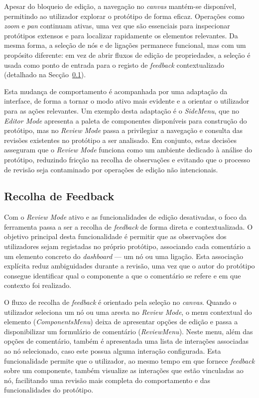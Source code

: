 Apesar do bloqueio de edição, a navegação no \textit{canvas} mantém-se disponível, permitindo ao utilizador explorar o protótipo de forma eficaz. Operações como \textit{zoom} e \textit{pan} continuam ativas, uma vez que são essenciais para inspecionar protótipos extensos e para localizar rapidamente os elementos relevantes. Da mesma forma, a seleção de nós e de ligações permanece funcional, mas com um propósito diferente: em vez de abrir fluxos de edição de propriedades, a seleção é usada como ponto de entrada para o registo de \textit{feedback} contextualizado (detalhado na Secção~\ref{subsec:cap4_review_integracao}).

Esta mudança de comportamento é acompanhada por uma adaptação da interface, de forma a tornar o modo ativo mais evidente e a orientar o utilizador para as ações relevantes. Um exemplo desta adaptação é o \textit{SideMenu}, que no \textit{Editor Mode} apresenta a paleta de componentes disponíveis para construção do protótipo, mas no \textit{Review Mode} passa a privilegiar a navegação e consulta das revisões existentes no protótipo a ser analisado. Em conjunto, estas decisões asseguram que o \textit{Review Mode} funciona como um ambiente dedicado à análise do protótipo, reduzindo fricção na recolha de observações e evitando que o processo de revisão seja contaminado por operações de edição não intencionais.

\subsection{Recolha de Feedback}
\label{subsec:cap4_review_integracao}

Com o \textit{Review Mode} ativo e as funcionalidades de edição desativadas, o foco da ferramenta passa a ser a recolha de \textit{feedback} de forma direta e contextualizada. O objetivo principal desta funcionalidade é permitir que as observações dos utilizadores sejam registadas no próprio protótipo, associando cada comentário a um elemento concreto do \textit{dashboard} --- um nó ou uma ligação. Esta associação explícita reduz ambiguidades durante a revisão, uma vez que o autor do protótipo consegue identificar qual o componente a que o comentário se refere e em que contexto foi realizado.

O fluxo de recolha de \textit{feedback} é orientado pela seleção no \textit{canvas}. Quando o utilizador seleciona um nó ou uma aresta no \textit{Review Mode}, o menu contextual do elemento (\textit{ComponentsMenu}) deixa de apresentar opções de edição e passa a disponibilizar um formulário de comentário (\textit{ReviewMenu}). Neste menu, além das opções de comentário, também é apresentada uma lista de interações associadas ao nó selecionado, caso este possua alguma interação configurada. Esta funcionalidade permite que o utilizador, ao mesmo tempo em que fornece \textit{feedback} sobre um componente, também visualize as interações que estão vinculadas ao nó, facilitando uma revisão mais completa do comportamento e das funcionalidades do protótipo.

